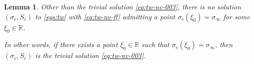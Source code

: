 \documentclass[12pt]{article}
\newtheorem{lemma}[theorem]{Lemma}
\theoremstyle{definition}
\theoremstyle{remark}
\numberwithin{equation}{section}
\begin{document}

\begin{lemma}
    \label{lm:no-crossing-asymptotics}
    Other than the trivial solution \eqref{eq:tw-nv-003}, there is no solution $ (\sigma_c, S_c) $ to \eqref{sys:tw} with \eqref{eq:tw-nv-ff} admitting a point $ \sigma_c (\xi_0) = \sigma_\infty $ for some $ \xi_0 \in \mathbb R $.

    In other words, 
    if there exists a point $ \xi_0 \in \mathbb R $ such that $ \sigma_c(\xi_0) = \sigma_\infty $, then $ (\sigma_c,S_c) $ is the trivial solution \eqref{eq:tw-nv-003}. 
\end{lemma}
\end{document}
